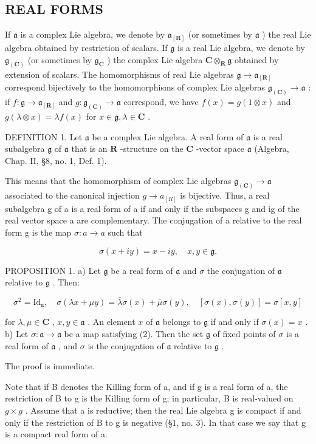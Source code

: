 \subsection{REAL FORMS}

If \(\mathfrak{a}\) is a complex Lie algebra, we denote by \(\mathfrak{a}_{[\mathbf{R} ]}\) (or sometimes by \(\mathfrak{a}\) ) the real Lie algebra obtained by restriction of scalars. If \(\mathfrak{g}\) is a real Lie algebra, we denote by \(\mathfrak{g}_{(\mathbf{C})}\) (or sometimes by \(\mathfrak{g}_{\mathbf{C}}\) ) the complex Lie algebra \(\mathbf{C}\otimes_{\mathbf{R}}\mathfrak{g}\) obtained by extension of scalars. The homomorphisms of real Lie algebras \(\mathfrak{g}\to \mathfrak{a}_{[\mathbf{R}]}\) correspond bijectively to the homomorphisms of complex Lie algebras \(\mathfrak{g}_{(\mathbf{C})}\to \mathfrak{a}\) : if \(f:\mathfrak{g}\to \mathfrak{a}_{[\mathbf{R}]}\) and \(g:\mathfrak{g}_{(\mathbf{C})}\to \mathfrak{a}\) correspond, we have \(f(x) = g(1\otimes x)\) and \(g(\lambda \otimes x) = \lambda f(x)\) for \(x\in \mathfrak{g},\lambda \in \mathbf{C}\) .

DEFINITION 1. Let \(\mathfrak{a}\) be a complex Lie algebra. A real form of \(\mathfrak{a}\) is a real subalgebra \(\mathfrak{g}\) of \(\mathfrak{a}\) that is an \(\mathbf{R}\) -structure on the \(\mathbf{C}\) -vector space \(\mathfrak{a}\) (Algebra, Chap. II, §8, no. 1, Def. 1).

This means that the homomorphism of complex Lie algebras \(\mathfrak{g}_{(\mathbf{C})}\to\mathfrak{a}\) associated to the canonical injection \(g\to a_{[R]}\) is bijective. Thus, a real subalgebra g of a is a real form of a if and only if the subspaces g and ig of the real vector space a are complementary. The conjugation of a relative to the real form g is the map \(\sigma:a\to a\) such that

\[
\sigma (x + i y) = x - i y, \quad x, y \in \mathfrak {g}.\tag{1}
\]

PROPOSITION 1. a) Let \(\mathfrak{g}\) be a real form of \(\mathfrak{a}\) and \(\sigma\) the conjugation of \(\mathfrak{a}\) relative to \(\mathfrak{g}\) . Then:

\[
\sigma^ {2} = \mathrm{Id} _ {\mathfrak {a}}, \quad \sigma (\lambda x + \mu y) = \bar {\lambda} \sigma (x) + \bar {\mu} \sigma (y), \quad [ \sigma (x), \sigma (y) ] = \sigma [ x, y ]\tag{2}
\]

for \(\lambda, \mu \in \mathbf{C}\) , \(x, y \in \mathfrak{a}\) . An element \(x\) of \(\mathfrak{a}\) belongs to \(\mathfrak{g}\) if and only if \(\sigma(x) = x\) . b) Let \(\sigma: \mathfrak{a} \to \mathfrak{a}\) be a map satisfying (2). Then the set \(\mathfrak{g}\) of fixed points of \(\sigma\) is a real form of \(\mathfrak{a}\) , and \(\sigma\) is the conjugation of \(\mathfrak{a}\) relative to \(\mathfrak{g}\) .

The proof is immediate.

Note that if B denotes the Killing form of a, and if g is a real form of a, the restriction of B to g is the Killing form of g; in particular, B is real-valued on \(g \times g\) . Assume that a is reductive; then the real Lie algebra g is compact if and only if the restriction of B to g is negative (§1, no. 3). In that case we say that g is a compact real form of a.

